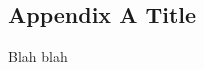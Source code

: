\documentclass[10pt]{ucthesis}
\begin{document}
\begin{thebibliography}{9}














\end{thebibliography}


\makeatletter
{}
\makeatother


\begin{appendices}
\chapter{Appendix A Title} \label{Appendix A}

Blah blah

\end{appendices}


\end{document}

